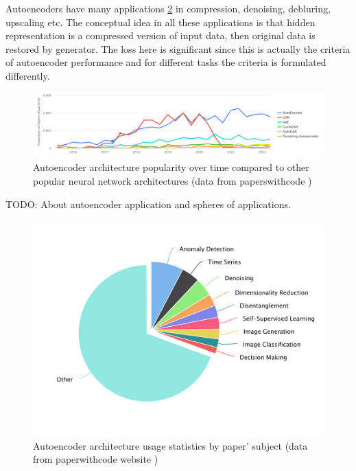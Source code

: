Autoencoders have many applications \ref{autoencoder-popularity-stats} in compression, denoising, debluring, upscaling etc. The conceptual idea in all these applications is that hidden representation is a compressed version of input data, then original data is restored by generator. The loss here is significant since this is actually the criteria of autoencoder performance and for different tasks the criteria is formulated differently.

\begin{figure}[!ht]
    \centering
    \includegraphics[width=\textwidth]{figure/autoencoder-popularity-over-time.png}
    \caption{Autoencoder architecture popularity over time compared to other popular neural network architectures (data from paperswithcode \cite{autoencoder_papers})}
    \label{autoencoder-popularity-dynamics}
\end{figure}

TODO: About autoencoder application and spheres of applications.

\begin{figure}[!ht]
    \centering
    \includegraphics[width=\textwidth]{figure/autoencoder-popularity-stats.png}
    \caption{Autoencoder architecture usage statistics by paper' subject (data from paperwithcode website \cite{autoencoder_papers})}
    \label{autoencoder-popularity-stats}
\end{figure}

